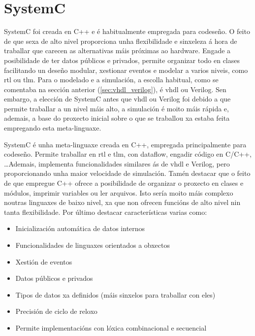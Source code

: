 \section{SystemC}\label{sec:systemc}
SystemC foi creada en C++ e é habitualmente empregada para codeseño. O feito de que sexa de alto nivel proporciona unha flexibilidade e sinxeleza á hora de traballar que carecen as alternativas máis próximas ao \gls{hardware}. Engade a posibilidade de ter datos públicos e privados, permite organizar todo en clases facilitando un deseño modular, xestionar eventos e modelar a varios niveis, como \acrfull{rtl} ou \acrfull{tlm}.
Para o modelado e a simulación, a escolla habitual, como se comentaba na sección anterior (\ref{sec:vhdl_verilog}), é \acrshort{vhdl} ou Verilog. Sen embargo, a elección de SystemC antes que \acrfull{vhdl} ou Verilog foi debido a que permite traballar a un nivel máis alto, a simulación é moito máis rápida e, ademais, a base do proxecto inicial sobre o que se traballou xa estaba feita empregando esta \gls{meta-linguaxe}.


SystemC é unha meta-linguaxe creada en C++, empregada principalmente para codeseño. Permite traballar en \acrshort{rtl} e \acrshort{tlm},  con dataflow, engadir código en C/C++, \dots  Ademais, implementa funcionalidades similares ás de \acrshort{vhdl} e Verilog, pero proporcionando unha maior velocidade de simulación. Tamén destacar que o feito de que empregue C++ ofrece a posibilidade de organizar o proxecto en clases e módulos, imprimir variables ou ler arquivos. Isto sería moito máis complexo noutras linguaxes de baixo nivel, xa que non ofrecen funcións de alto nivel nin tanta flexibilidade. Por último destacar características varias como: \begin{itemize}
    \item Inicialización automática de datos internos
    \item Funcionalidades de linguaxes orientados a obxectos
    \item Xestión de eventos
    \item Datos públicos e privados
    \item Tipos de datos xa definidos (máis sinxelos para traballar con eles)
    \item Precisión de ciclo de reloxo
    \item Permite implementacións con lóxica combinacional e secuencial
\end{itemize} 


